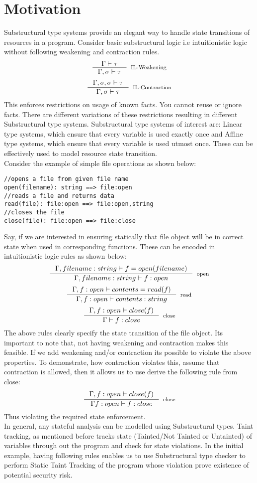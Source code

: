 \documentclass[11pt, pdftex]{article}
\begin{document}
\section{Motivation}
Substructural type systems provide an elegant way to handle state transitions of resources in a program. Consider basic substructural logic i.e intuitionistic logic without following weakening and contraction rules.
$$ \inference {\Gamma \vdash \tau}{\Gamma,\sigma \vdash \tau}[IL-Weakening]$$
$$ \inference {\Gamma,\sigma,\sigma \vdash \tau}{\Gamma,\sigma \vdash \tau}[IL-Contraction]$$
This enforces restrictions on usage of known facts. You cannot reuse or ignore facts. There are different variations of these restrictions resulting in different Substructural type systems. Substructural type systems of interest are: Linear type systems, which ensure that every variable is used exactly once and Affine  type systems, which ensure that every variable is used utmost once. These can be effectively used to model resource state transition.\\
Consider the example of simple file operations as shown below:
\begin{lstlisting}
//opens a file from given file name
open(filename): string ==> file:open
//reads a file and returns data
read(file): file:open ==> file:open,string
//closes the file
close(file): file:open ==> file:close
\end{lstlisting}
Say, if we are interested in ensuring statically that file object will be in correct state when used in corresponding functions. These can be encoded in intuitionistic logic rules as shown below:
$$ \inference {\Gamma, filename:string \vdash f = open(filename)}{\Gamma, filename:string \vdash f:open }[open]$$
$$ \inference {\Gamma, f:open \vdash contents = read(f) }{\Gamma, f:open \vdash contents:string}[read]$$
$$ \inference {\Gamma, f:open \vdash close(f)}{\Gamma \vdash f:close}[close]$$
The above rules clearly specify the state transition of the file object. Its important to note that, not having weakening and contraction makes this feasible. If we add weakening and/or contraction its possible to violate the above properties. To demonstrate, how contraction violates this, assume that contraction is allowed, then it allows us to use derive the following rule from close:
$$ \inference {\Gamma, f:open \vdash close(f)}{\Gamma f:open \vdash f:close}[close]$$
Thus violating the required state enforcement.\\
In general, any stateful analysis can be modelled using Substructural types. Taint tracking, as mentioned before tracks state (Tainted/Not Tainted or Untainted) of variables through out the program and check for state violations. In the initial example, having following rules enables us to use Substructural type checker to perform Static Taint Tracking of the program whose violation prove existence of potential security risk.
\end{document}
